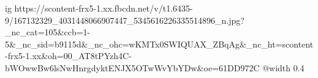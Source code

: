  
 
 
 
 

\ifcmt
  ig https://scontent-frx5-1.xx.fbcdn.net/v/t1.6435-9/167132329_4031448066907447_5345616226335514896_n.jpg?_nc_cat=105&ccb=1-5&_nc_sid=b9115d&_nc_ohc=wKMTx0SWIQUAX_ZBqAg&_nc_ht=scontent-frx5-1.xx&oh=00_AT8tPYzh4C-bWOwwBw6lsNwHnrgdyktENJX5OTwWvYbYDw&oe=61DD972C
  @width 0.4
\fi
